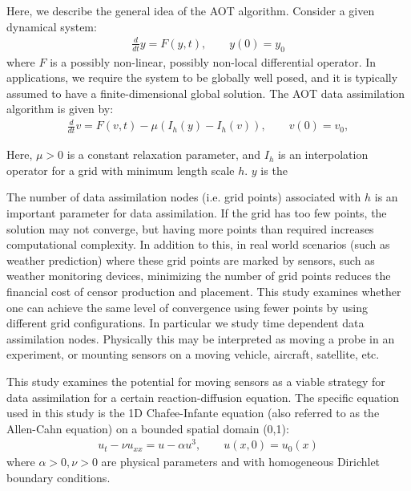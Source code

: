 \documentclass[12pt]{amsart}
\theoremstyle{plain}
\theoremstyle{definition}
\theoremstyle{remark}
\numberwithin{equation}{section} %
\numberwithin{figure}{section}   %
\begin{document}
Here, we describe the general idea of the AOT algorithm. Consider a given dynamical system:
\begin{align*}
\frac{d}{dt}y = F(y,t), \qquad y(0) = y_0
\end{align*}
where $F$ is a possibly non-linear, possibly non-local differential operator. In applications, we require the system to be globally well posed, and it is typically assumed to have a finite-dimensional global solution. The AOT data assimilation algorithm is given by:
\begin{align*}
\frac{d}{dt}v = F(v,t) - \mu(I_h(y)-I_h(v)),\qquad v(0) = v_0,
\end{align*}

Here, $\mu > 0$ is a constant relaxation parameter, and $I_h$ is an interpolation operator for a grid with minimum length scale $h$. $y$ is the

The number of data assimilation nodes (i.e. grid points) associated with $h$ is an important parameter for data assimilation. If the grid has too few points, the solution may not converge, but having more points than required increases computational complexity. In addition to this, in real world scenarios (such as weather prediction) where these grid points are marked by sensors, such as weather monitoring devices, minimizing the number of grid points reduces the financial cost of censor production and placement. This study examines whether one can achieve the same level of convergence using fewer points by using different grid configurations. In particular we study time dependent data assimilation nodes. Physically this may be interpreted as moving a probe in an experiment, or mounting sensors on a moving vehicle, aircraft, satellite, etc.

This study examines the potential for moving sensors as a viable strategy for data assimilation for a certain reaction-diffusion equation. The specific equation used in this study is the 1D Chafee-Infante equation (also referred to as the Allen-Cahn equation) on a bounded spatial domain (0,1):
\begin{align}
u_t - \nu u_{xx} = u - \alpha u^3, \qquad
u(x,0) = u_0(x)
\end{align}
where $\alpha>0, \nu>0$ are physical parameters and with homogeneous Dirichlet boundary conditions.
\end{document}
